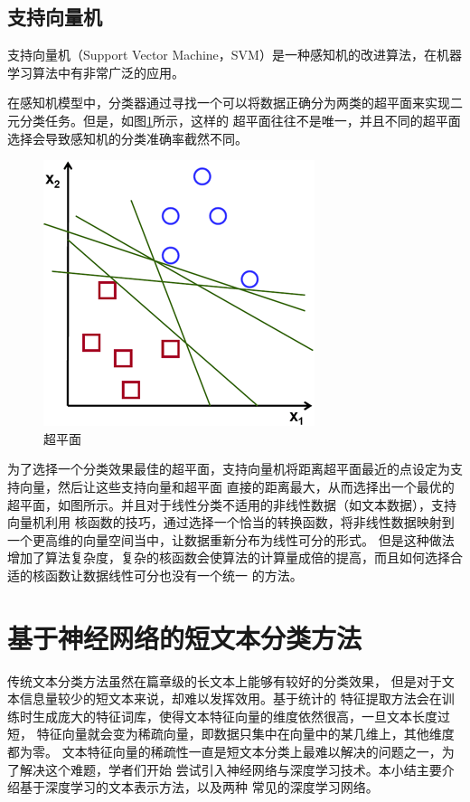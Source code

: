 \subsection{支持向量机}
支持向量机（Support Vector Machine，SVM）是一种感知机的改进算法，在机器学习算法中有非常广泛的应用。

在感知机模型中，分类器通过寻找一个可以将数据正确分为两类的超平面来实现二元分类任务。但是，如图\ref{separating_lines}所示，这样的
超平面往往不是唯一，并且不同的超平面选择会导致感知机的分类准确率截然不同。
\begin{figure}[h]
    \includegraphics[scale=3]{picture/separating-lines.png}
    \caption{超平面}
    \label{separating_lines}
\end{figure}

为了选择一个分类效果最佳的超平面，支持向量机将距离超平面最近的点设定为支持向量，然后让这些支持向量和超平面
直接的距离最大，从而选择出一个最优的超平面，如图所示。并且对于线性分类不适用的非线性数据（如文本数据），支持向量机利用
核函数的技巧，通过选择一个恰当的转换函数，将非线性数据映射到一个更高维的向量空间当中，让数据重新分布为线性可分的形式。
但是这种做法增加了算法复杂度，复杂的核函数会使算法的计算量成倍的提高，而且如何选择合适的核函数让数据线性可分也没有一个统一
的方法。

\section{基于神经网络的短文本分类方法}
传统文本分类方法虽然在篇章级的长文本上能够有较好的分类效果，
但是对于文本信息量较少的短文本来说，却难以发挥效用。基于统计的
特征提取方法会在训练时生成庞大的特征词库，使得文本特征向量的维度依然很高，一旦文本长度过短，
特征向量就会变为稀疏向量，即数据只集中在向量中的某几维上，其他维度都为零。
文本特征向量的稀疏性一直是短文本分类上最难以解决的问题之一，为了解决这个难题，学者们开始
尝试引入神经网络与深度学习技术。本小结主要介绍基于深度学习的文本表示方法，以及两种
常见的深度学习网络。

